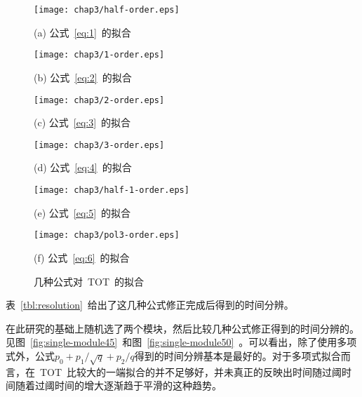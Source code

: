 \begin{figure}[!h]
\begin{minipage}{0.5\linewidth}
  \centerline{\texttt{[image: chap3/half-order.eps]}}
  \centerline{(a) 公式~\ref{eq:1}~的拟合}
  \centerline{\label{fig:half-order}}
\end{minipage}
\hfill
\begin{minipage}{0.5\linewidth}
  \centerline{\texttt{[image: chap3/1-order.eps]}}
  \centerline{(b) 公式~\ref{eq:2}~的拟合}
  \centerline{\label{fig:1-order}}
\end{minipage}
\vfill
\begin{minipage}{0.5\linewidth}
  \centerline{\texttt{[image: chap3/2-order.eps]}}
  \centerline{(c) 公式~\ref{eq:3}~的拟合}
  \centerline{\label{fig:2-order}}
\end{minipage}
\hfill
\begin{minipage}{0.5\linewidth}
  \centerline{\texttt{[image: chap3/3-order.eps]}}
  \centerline{(d) 公式~\ref{eq:4}~的拟合}
  \centerline{\label{fig:3-order}}
\end{minipage}
\vfill
\begin{minipage}{0.5\linewidth}
  \centerline{\texttt{[image: chap3/half-1-order.eps]}}
  \centerline{(e) 公式~\ref{eq:5}~的拟合}
  \centerline{\label{fig:half-1-order}}
\end{minipage}
\hfill
\begin{minipage}{0.5\linewidth}
  \centerline{\texttt{[image: chap3/pol3-order.eps]}}
  \centerline{(f) 公式~\ref{eq:6}~的拟合}
  \centerline{\label{fig:pol3-order}}
\end{minipage}
\caption{几种公式对~TOT~的拟合}
\label{fig:single-formula}
\end{figure}

表~\ref{tbl:resolution}~给出了这几种公式修正完成后得到的时间分辨。

在此研究的基础上随机选了两个模块，然后比较几种公式修正得到的时间分辨的。见图~\ref{fig:single-module45}~和图~\ref{fig:single-module50}~。可以看出，除了使用多项式外，公式${p_{0}+p_{1}/\sqrt{q}+p_{2}/q}$得到的时间分辨基本是最好的。对于多项式拟合而言，在~TOT~比较大的一端拟合的并不足够好，并未真正的反映出时间随过阈时间随着过阈时间的增大逐渐趋于平滑的这种趋势。

